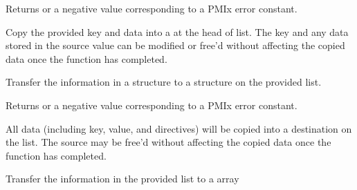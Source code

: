 Returns  or a negative value corresponding to a PMIx error constant.

\descr

Copy the provided key and data into a  at the head of list. The key and any data stored in the source value can be modified or free'd without affecting the copied data once the function has completed.


\summary

Transfer the information in a  structure to a structure on the provided list.

\format



\begin{arglist}
\end{arglist}

Returns  or a negative value corresponding to a PMIx error constant.

\descr

All data (including key, value, and directives) will be copied into a destination  on the list. The source  may be free'd without affecting the copied data once the function has completed.



\summary

Transfer the information in the provided  list to a  array

\format



